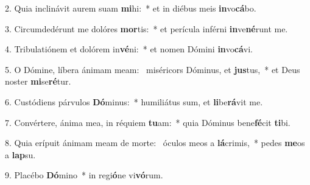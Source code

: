 2. Quia inclinávit aurem suam \textbf{mi}hi:~*  et in diébus meis \textbf{in}vo\textbf{cá}bo.\

3. Circumdedérunt me dolóres \textbf{mor}tis:~*  et perícula inférni \textbf{in}ve\textbf{né}runt me.\

4. Tribulatiónem et dolórem in\textbf{vé}ni:~*  et nomen Dómini \textbf{in}vo\textbf{cá}vi.\

5. O Dómine, líbera ánimam meam: \dag\  miséricors Dóminus, et \textbf{jus}tus,~*  et Deus noster \textbf{mi}se\textbf{ré}tur.\

6. Custódiens párvulos \textbf{Dó}minus:~*  humiliátus sum, et \textbf{li}be\textbf{rá}vit me.\

7. Convértere, ánima mea, in réquiem \textbf{tu}am:~*  quia Dóminus bene\textbf{fé}cit \textbf{ti}bi.\

8. Quia erípuit ánimam meam de morte: \dag\  óculos meos a \textbf{lá}crimis,~*  pedes \textbf{me}os a \textbf{lap}su.\

9. Placébo \textbf{Dó}mino~*  in regi\textbf{ó}ne vi\textbf{vó}rum.\

